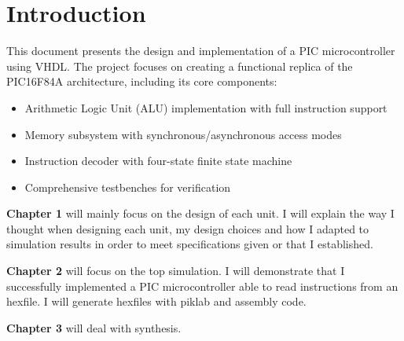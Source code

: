 \chapter*{Introduction}

This document presents the design and implementation of a PIC microcontroller using VHDL. The project focuses on creating a functional replica of the PIC16F84A architecture, including its core components:

\begin{itemize}
    \item Arithmetic Logic Unit (ALU) implementation with full instruction support
    \item Memory subsystem with synchronous/asynchronous access modes
    \item Instruction decoder with four-state finite state machine
    \item Comprehensive testbenches for verification
\end{itemize}

\textbf{Chapter 1} will mainly focus on the design of each unit. I will explain the way I thought when designing each unit, my design choices and how I adapted to simulation results in order to meet specifications given or that I established. 

\textbf{Chapter 2} will focus on the top simulation. I will demonstrate that I successfully implemented a PIC microcontroller able to read instructions from an hexfile. I will generate hexfiles with piklab and assembly code. 

\textbf{Chapter 3} will deal with synthesis. 
